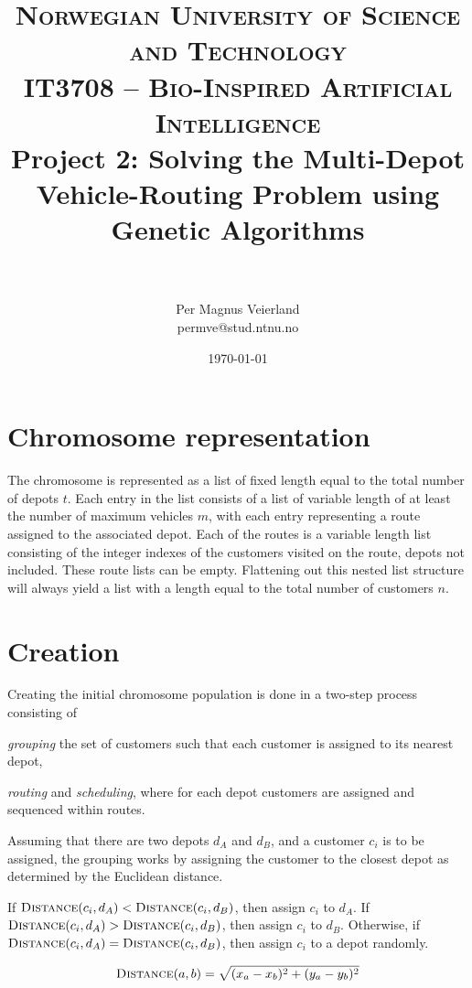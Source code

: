 \documentclass[paper=a4, fontsize=9pt]{scrartcl}
\title{
\vspace{-1cm}
\normalfont \normalsize
\textsc{Norwegian University of Science and Technology\\IT3708 -- Bio-Inspired Artificial Intelligence}
\horrule{0.5pt} \\[0cm]
\Huge Project 2: Solving the Multi-Depot \\Vehicle-Routing Problem using Genetic Algorithms\\[-0.3cm]
\horrule{2pt} \\[0.1cm]
}
\author{Per Magnus Veierland\\permve@stud.ntnu.no}
\date{\normalsize\today}
\begin{document}
\maketitle

\begin{multicols}{2}

\section*{Chromosome representation}

The chromosome is represented as a list of fixed length equal to the total number of depots $t$. Each entry in the list consists of a list of variable length of at least the number of maximum vehicles $m$, with each entry representing a route assigned to the associated depot. Each of the routes is a variable length list consisting of the integer indexes of the customers visited on the route, depots not included. These route lists can be empty. Flattening out this nested list structure will always yield a list with a length equal to the total number of customers $n$.

\section*{Creation}

Creating the initial chromosome population is done in a two-step process consisting of
\begin{enumerate*}[label=\alph*)]
    \item \textit{grouping} the set of customers such that each customer is assigned to its nearest depot,
    \item \textit{routing} and \textit{scheduling}, where for each depot customers are assigned and sequenced within routes.
\end{enumerate*}

Assuming that there are two depots $d_A$ and $d_B$, and a customer $c_i$ is to be assigned, the grouping works by assigning the customer to the closest depot as determined by the Euclidean distance.

If $\textsc{Distance}(c_i, d_A) < \textsc{Distance}(c_i, d_B)$, then assign $c_i$ to $d_A$. If $\textsc{Distance}(c_i, d_A) > \textsc{Distance}(c_i, d_B)$, then assign $c_i$ to $d_B$. Otherwise, if $\textsc{Distance}(c_i, d_A) = \textsc{Distance}(c_i, d_B)$, then assign $c_i$ to a depot randomly.

\begin{equation}
\textsc{Distance}(a, b) = \sqrt{(x_a - x_b)^2 + (y_a - y_b)^2}
\end{equation}


\end{multicols}
\end{document}
